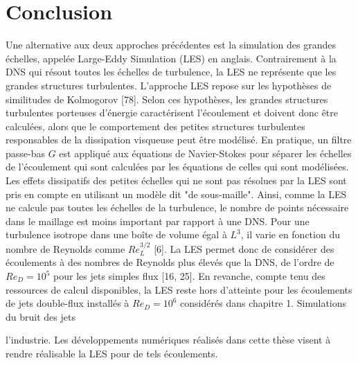 \section{Conclusion}

Une alternative aux deux approches précédentes est la simulation des grandes échelles, appelée Large-Eddy Simulation (LES) en anglais. Contrairement à la DNS qui résout toutes les échelles de turbulence, la LES ne représente que les grandes structures turbulentes. L'approche LES repose sur les hypothèses de similitudes de Kolmogorov [78]. Selon ces hypothèses, les grandes structures turbulentes porteuses d'énergie caractérisent l'écoulement et doivent donc être calculées, alors que le comportement des petites structures turbulentes responsables de la dissipation visqueuse peut être modélisé. En pratique, un filtre passe-bas $G$ est appliqué aux équations de Navier-Stokes pour séparer les échelles de l'écoulement qui sont calculées par les équations de celles qui sont modélisées. Les effets dissipatifs des petites échelles qui ne sont pas résolues par la LES sont pris en compte en utilisant un modèle dit "de sous-maille". Ainsi, comme la LES ne calcule pas toutes les échelles de la turbulence, le nombre de points nécessaire dans le maillage est moins important par rapport à une DNS. Pour une turbulence isotrope dans une boîte de volume égal à $L^{3}$, il varie en fonction du nombre de Reynolds comme $R e_{L}^{3 / 2}$ [6]. La LES permet donc de considérer des écoulements à des nombres de Reynolds plus élevés que la DNS, de l'ordre de $R e_{D}=10^{5}$ pour les jets simples flux [16, 25]. En revanche, compte tenu des ressources de calcul disponibles, la LES reste hors d'atteinte pour les écoulements de jets double-flux installés à $R e_{D}=10^{6}$ considérés dans chapitre 1. Simulations du bruit des jets

l'industrie. Les développements numériques réalisés dans cette thèse visent à rendre réalisable la LES pour de tels écoulements.
